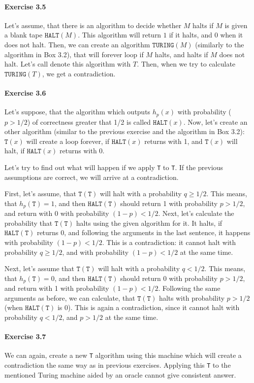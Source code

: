 \documentclass[a4paper,12pt]{article}
\newcommand{\exercise}[1]{\paragraph{Exercise #1}}
\begin{document}
    \exercise{3.5} Let's assume, that there is an algorithm to decide whether $M$ halts if $M$ is given a blank tape $\texttt{HALT}(M)$. This algorithm will return $1$ if it halts, and $0$ when it does not halt. Then, we can create an algorithm $\texttt{TURING}(M)$ (similarly to the algorithm in Box 3.2), that will forever loop if $M$ halts, and halts if $M$ does not halt. Let's call denote this algorithm with $T$. Then, when we try to calculate $\texttt{TURING}(T)$, we get a contradiction.

    \exercise{3.6} Let's suppose, that the algorithm which outputs $h_p(x)$ with probability ($p > 1/2$) of correctness greater that 1/2 is called $\texttt{HALT}(x)$. Now, let's create an other algorithm (similar to the previous exercise and the algorithm in Box 3.2): $\texttt{T}(x)$ will create a loop forever, if $\texttt{HALT}(x)$ returns with 1, and $\texttt{T}(x)$ will halt, if $\texttt{HALT}(x)$ returns with 0.

    Let's try to find out what will happen if we apply \texttt{T} to \texttt{T}. If the previous assumptions are correct, we will arrive at a contradiction.

    First, let's assume, that $\texttt{T}(\texttt{T})$ will halt with a probability $q \geq 1/2$. This means, that $h_p(\texttt{T}) = 1$, and then $\texttt{HALT}(\texttt{T})$ should return 1 with probability $p > 1/2$, and return with $0$ with probability $(1 - p) < 1/2$. Next, let's calculate the probability that $\texttt{T}(\texttt{T})$ halts using the given algorithm for it.
    It halts, if $\texttt{HALT}(\texttt{T})$ returns 0, and following the arguments in the last sentence, it happens with probability $(1 - p) < 1/2$. This is a contradiction: it cannot halt with probability $q \geq 1/2$, and with probability $(1 - p) < 1/2$ at the same time.

    Next, let's assume that $\texttt{T}(\texttt{T})$ will halt with a probability $q < 1/2$. This means, that $h_p(\texttt{T}) = 0$, and then $\texttt{HALT}(\texttt{T})$ should return 0 with probability $p > 1/2$, and return with 1 with probability $(1 - p) < 1/2$. Following the same arguments as before, we can calculate, that $\texttt{T}(\texttt{T})$ halts with probability $p > 1/2$ (when $\texttt{HALT}(\texttt{T})$ is 0). This is again a contradiction, since it cannot halt with probability $q < 1/2$, and $p > 1/2$ at the same time.

    \exercise{3.7} We can again, create a new \texttt{T} algorithm using this machine which will create a contradiction the same way as in previous exercises. Applying this \texttt{T} to the mentioned Turing machine aided by an oracle cannot give consistent answer.
\end{document}
